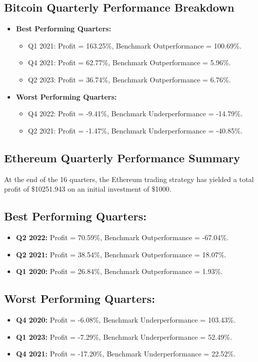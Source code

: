 \documentclass[12pt]{article}
\begin{document}
\subsection{Bitcoin Quarterly Performance Breakdown}
\begin{itemize}
    \item \textbf{Best Performing Quarters:}
    \begin{itemize}
        \item Q1 2021: Profit = 163.25\%, Benchmark Outperformance = 100.69\%.
        \item Q4 2021: Profit = 62.77\%, Benchmark Outperformance = 5.96\%.
        \item Q2 2023: Profit = 36.74\%, Benchmark Outperformance = 6.76\%.
    \end{itemize}
    \item \textbf{Worst Performing Quarters:}
    \begin{itemize}
        \item Q4 2022: Profit = -9.41\%, Benchmark Underperformance = -14.79\%.
        \item Q2 2021: Profit = -1.47\%, Benchmark Underperformance = -40.85\%.
    \end{itemize}
\end{itemize}


\subsection{Ethereum Quarterly Performance Summary}

At the end of the 16 quarters, the Ethereum trading strategy has yielded a total profit of \$10251.943 on an initial investment of \$1000.

\subsection*{Best Performing Quarters:}
\begin{itemize}
    \item \textbf{Q2 2022:} Profit = 70.59\%, Benchmark Outperformance = -67.04\%.
    \item \textbf{Q2 2021:} Profit = 38.54\%, Benchmark Outperformance = 18.07\%.
    \item \textbf{Q1 2020:} Profit = 26.84\%, Benchmark Outperformance = 1.93\%.
\end{itemize}

\subsection*{Worst Performing Quarters:}
\begin{itemize}
    \item \textbf{Q4 2020:} Profit = -6.08\%, Benchmark Underperformance = 103.43\%.
    \item \textbf{Q1 2023:} Profit = -7.29\%, Benchmark Underperformance = 52.49\%.
    \item \textbf{Q4 2021:} Profit = -17.20\%, Benchmark Underperformance = 22.52\%.
\end{itemize}
\end{document}
